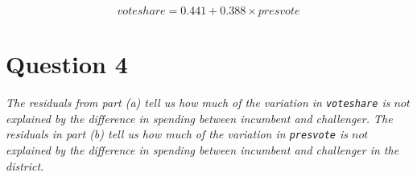 \documentclass[12pt,letterpaper]{article}
\begin{document}
\begin{enumerate}
		
		\begin{equation*}
		voteshare = 0.441 + 0.388 \times presvote
		\end{equation*}
		
	\end{enumerate}
	
	
	\newpage	
	\section*{Question 4}
	\noindent \emph{The residuals from part (a) tell us how much of the variation in \texttt{voteshare} is $not$ explained by the difference in spending between incumbent and challenger. The residuals in part (b) tell us how much of the variation in \texttt{presvote} is $not$ explained by the difference in spending between incumbent and challenger in the district.}
\end{document}
